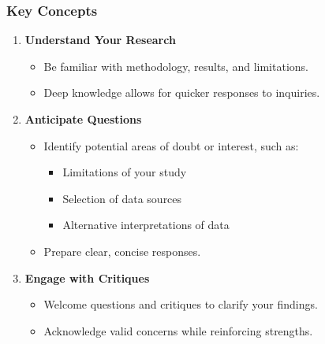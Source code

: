 \documentclass{beamer}
\begin{document}
\begin{frame}[fragile]
    \frametitle{Key Concepts}
    \begin{enumerate}
        \item \textbf{Understand Your Research}
        \begin{itemize}
            \item Be familiar with methodology, results, and limitations.
            \item Deep knowledge allows for quicker responses to inquiries.
        \end{itemize}
        \item \textbf{Anticipate Questions}
        \begin{itemize}
            \item Identify potential areas of doubt or interest, such as:
            \begin{itemize}
                \item Limitations of your study
                \item Selection of data sources
                \item Alternative interpretations of data
            \end{itemize}
            \item Prepare clear, concise responses.
        \end{itemize}
        \item \textbf{Engage with Critiques}
        \begin{itemize}
            \item Welcome questions and critiques to clarify your findings.
            \item Acknowledge valid concerns while reinforcing strengths.
        \end{itemize}
    \end{enumerate}
\end{frame}
\end{document}
